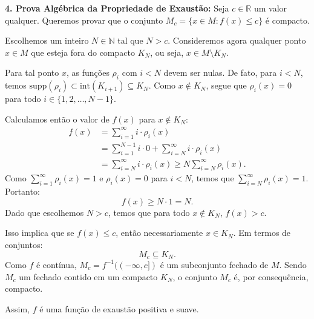 {	\textbf{4. Prova Algébrica da Propriedade de Exaustão:}
	Seja $c \in \mathbb{R}$ um valor qualquer. Queremos provar que o conjunto $M_c = \{x \in M : f(x) \le c\}$ é compacto. 
	
	Escolhemos um inteiro $N \in \mathbb{N}$ tal que $N > c$. Consideremos agora qualquer ponto $x \in M$ que esteja fora do compacto $K_N$, ou seja, $x \in M \setminus K_N$. 
	
	Para tal ponto $x$, as funções $\rho_i$ com $i < N$ devem ser nulas. De fato, para $i < N$, temos $\text{supp}(\rho_i) \subset \text{int}(K_{i+1}) \subseteq K_N$. Como $x \notin K_N$, segue que $\rho_i(x) = 0$ para todo $i \in \{1, 2, \dots, N-1\}$. 
	
	Calculamos então o valor de $f(x)$ para $x \notin K_N$:
	\begin{align*}
		f(x) &= \sum_{i=1}^\infty i \cdot \rho_i(x) \\
		&= \sum_{i=1}^{N-1} i \cdot 0 + \sum_{i=N}^\infty i \cdot \rho_i(x) \\
		&= \sum_{i=N}^\infty i \cdot \rho_i(x) \ge N \sum_{i=N}^\infty \rho_i(x).
	\end{align*}
	Como $\sum_{i=1}^\infty \rho_i(x) = 1$ e $\rho_i(x) = 0$ para $i < N$, temos que $\sum_{i=N}^\infty \rho_i(x) = 1$. Portanto:
	\begin{equation*}
		f(x) \ge N \cdot 1 = N.
	\end{equation*}
	Dado que escolhemos $N > c$, temos que para todo $x \notin K_N$, $f(x) > c$. 
	
	Isso implica que se $f(x) \le c$, então necessariamente $x \in K_N$. Em termos de conjuntos:
	\begin{equation*}
		M_c \subseteq K_N.
	\end{equation*}
	Como $f$ é contínua, $M_c = f^{-1}((-\infty, c])$ é um subconjunto fechado de $M$. Sendo $M_c$ um fechado contido em um compacto $K_N$, o conjunto $M_c$ é, por consequência, compacto.
	
	Assim, $f$ é uma função de exaustão positiva e suave.
}
